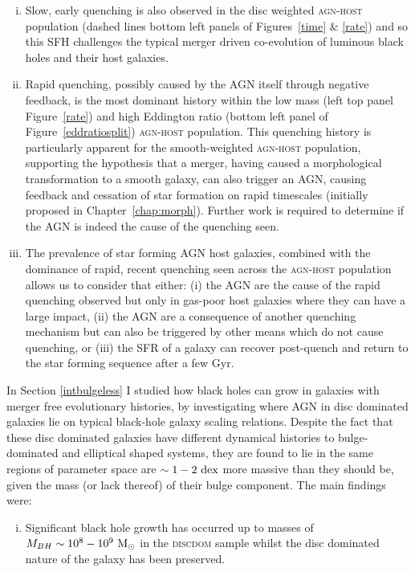 {\begin{enumerate}[(i)]
\item Slow, early quenching is also observed in the disc weighted \textsc{agn-host} population (dashed lines bottom left panels of Figures~\ref{time} \& \ref{rate}) and so this SFH challenges the typical merger driven co-evolution of luminous black holes and their host galaxies.

\item Rapid quenching, possibly caused by the AGN itself through negative feedback, is the most dominant history within the low mass (left top panel Figure~\ref{rate}) and high Eddington ratio (bottom left panel of Figure~\ref{eddratiosplit}) \textsc{agn-host} population. This quenching history is particularly apparent for the smooth-weighted \textsc{agn-host} population, supporting the hypothesis that a merger, having caused a morphological transformation to a smooth galaxy, can also trigger an AGN, causing feedback and cessation of star formation on rapid timescales (initially proposed in Chapter~\ref{chap:morph}). Further work is required to determine if the AGN is indeed the cause of the quenching seen. 

\item The prevalence of star forming AGN host galaxies, combined with the dominance of rapid, recent quenching seen across the \textsc{agn-host} population allows us to consider that either: (i)  the AGN are the cause of the rapid quenching observed but only in gas-poor host galaxies where they can have a large impact, (ii) the AGN are a consequence of another quenching mechanism but can also be triggered by other means which do not cause quenching, or (iii) the SFR of a galaxy can recover post-quench and return to the star forming sequence after a few Gyr.

\end{enumerate}

In Section \ref{intbulgeless} I studied how black holes can grow in galaxies with merger free evolutionary histories, by investigating where AGN in disc dominated galaxies lie on typical black-hole galaxy scaling relations. Despite the fact that these disc dominated galaxies have different dynamical histories to bulge-dominated and elliptical shaped systems, they are found to lie in the same regions of parameter space are $\sim1-2~\rm{dex}$ more massive than they should be, given the mass (or lack thereof) of their bulge component. The main findings were:
\begin{enumerate}[(i)]
\item Significant black hole growth has occurred up to masses of $M_{BH}\sim10^8 - 10^9~\rm{M}_{\odot}$ in the \textsc{discdom} sample whilst the disc dominated nature of the galaxy has been preserved.


\end{enumerate}}
